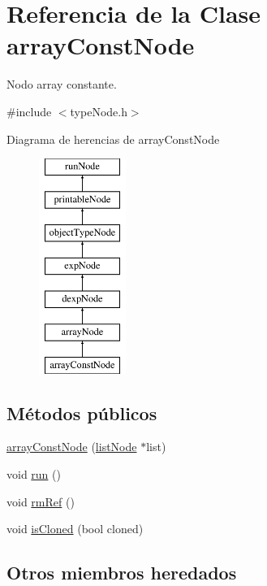 \hypertarget{classarrayConstNode}{\section{Referencia de la Clase array\-Const\-Node}
\label{classarrayConstNode}
}


Nodo array constante.  




{\ttfamily \#include $<$type\-Node.\-h$>$}

Diagrama de herencias de array\-Const\-Node\begin{figure}[H]
\begin{center}
\leavevmode
\includegraphics[height=7.000000cm]{classarrayConstNode}
\end{center}
\end{figure}
\subsection*{Métodos públicos}
\begin{DoxyCompactItemize}
\item 
\hyperlink{classarrayConstNode_a6032c2b8e43345e5198e1331ec64d729}{array\-Const\-Node} (\hyperlink{classlistNode}{list\-Node} $\ast$list)
\item 
void \hyperlink{classarrayConstNode_a84b4ae603b7c24d96f16a8acc94a0403}{run} ()
\item 
void \hyperlink{classarrayConstNode_a93fccf8c5a3fa33313a21b8e3e8838f0}{rm\-Ref} ()
\item 
void \hyperlink{classarrayConstNode_aba71d93899fadd2d756009ce16f5eefc}{is\-Cloned} (bool cloned)
\end{DoxyCompactItemize}
\subsection*{Otros miembros heredados}


